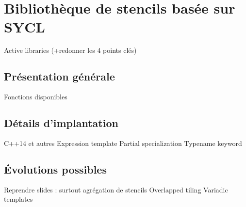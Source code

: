 
\chapter{Bibliothèque de stencils basée sur SYCL}

Active libraries \cite{Art20} (+redonner les 4 points clés)

\section{Présentation générale}

Fonctions disponibles

\section{Détails d'implantation}

C++14 et autres
Expression template \cite{Web4,Art21}
Partial specialization \cite{Web1}
Typename keyword \cite{Web2}

\section{\'Evolutions possibles}

Reprendre slides : surtout agrégation de stencils
Overlapped tiling \cite{Art17}
Variadic templates \cite{Art6}


